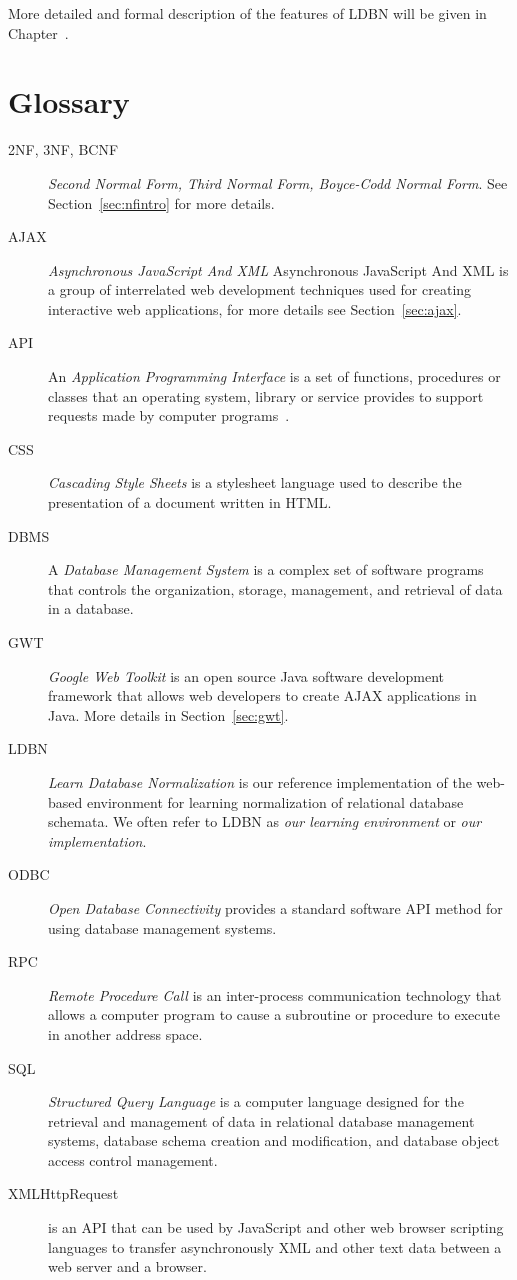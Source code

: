 More detailed and formal description of the features of LDBN will be given in
Chapter~\cite{chap:motivation}. 

\section{Glossary}
\begin{description}
	\item[2NF, 3NF, BCNF] \emph{Second Normal Form, Third Normal Form, Boyce-Codd Normal Form}. See Section~\ref{sec:nfintro} for more details.
	\item[AJAX] \emph{Asynchronous JavaScript And XML} Asynchronous JavaScript And XML is a group of interrelated web development techniques used for creating interactive web applications, for more details see Section~\ref{sec:ajax}.
	\item[API] An \emph{Application Programming Interface} is a set of functions, procedures or classes that an operating system, library or service provides to support requests made by computer programs~\cite{wapi}.
	\item[CSS] \emph{Cascading Style Sheets} is a stylesheet language used to describe the presentation of a document written in HTML.
	\item[DBMS] A \emph{Database Management System} is a complex set of software programs that controls the organization, storage, management, and retrieval of data in a database.
	\item[GWT] \emph{Google Web Toolkit} is an open source Java software development framework that allows web developers to create AJAX applications in Java. More details in Section~\ref{sec:gwt}.
	\item[LDBN] \emph{Learn Database Normalization} is our reference implementation of the web-based environment for
    learning normalization of relational database schemata. We often refer to LDBN as \emph{our learning environment} or \emph{our implementation}.
	\item[ODBC] \emph{Open Database Connectivity} provides a standard software API method for using database management systems.
	\item[RPC] \emph{Remote Procedure Call} is an inter-process communication technology that allows a computer program to cause a subroutine or procedure to execute in another address space.
	\item[SQL] \emph{Structured Query Language} is a computer language designed for the retrieval and management of data in relational database management systems, database schema creation and modification, and database object access control management.
	\item[XMLHttpRequest] is an API that can be used by JavaScript and other web browser scripting languages to transfer asynchronously XML and other text data between a web server and a browser.
\end{description}
